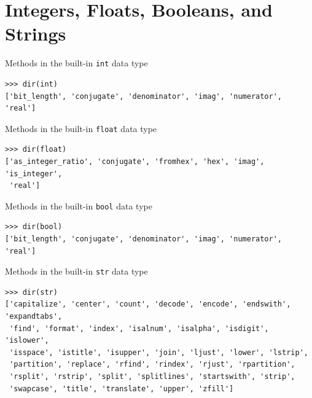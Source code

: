 \documentclass[8pt,a4paper,compress,handout]{beamer}
\begin{document}
\section{Integers, Floats, Booleans, and Strings}
\begin{frame}[fragile]
Methods in the built-in \lstinline{int} data type
\begin{lstlisting}[language={}]
>>> dir(int) 
['bit_length', 'conjugate', 'denominator', 'imag', 'numerator', 'real']
\end{lstlisting}

\bigskip

Methods in the built-in \lstinline{float} data type
\begin{lstlisting}[language={}]
>>> dir(float) 
['as_integer_ratio', 'conjugate', 'fromhex', 'hex', 'imag', 'is_integer', 
 'real']
\end{lstlisting}

\bigskip

Methods in the built-in \lstinline{bool} data type
\begin{lstlisting}[language={}]
>>> dir(bool) 
['bit_length', 'conjugate', 'denominator', 'imag', 'numerator', 'real']
\end{lstlisting}

\bigskip

Methods in the built-in \lstinline{str} data type
\begin{lstlisting}[language={}]
>>> dir(str)
['capitalize', 'center', 'count', 'decode', 'encode', 'endswith', 'expandtabs', 
 'find', 'format', 'index', 'isalnum', 'isalpha', 'isdigit', 'islower', 
 'isspace', 'istitle', 'isupper', 'join', 'ljust', 'lower', 'lstrip', 
 'partition', 'replace', 'rfind', 'rindex', 'rjust', 'rpartition', 
 'rsplit', 'rstrip', 'split', 'splitlines', 'startswith', 'strip', 
 'swapcase', 'title', 'translate', 'upper', 'zfill']
\end{lstlisting}
\end{frame}
\end{document}
